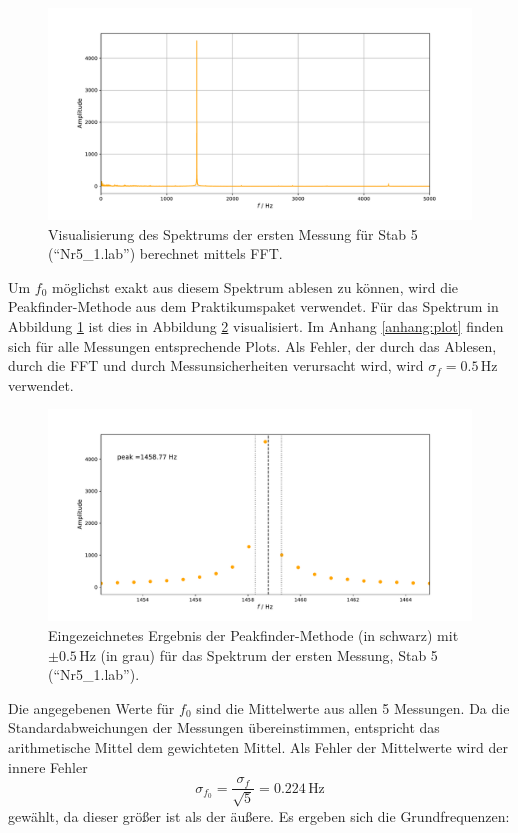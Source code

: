 \documentclass[a4paper, 12pt]{scrartcl}
\begin{document}
\begin{figure}[H]
	\centering
	\includegraphics[width=\linewidth]{plots/spektrum1.pdf}
	\caption{Visualisierung des Spektrums der ersten Messung für Stab 5 (\mbox{``Nr5\_1.lab''}) berechnet mittels FFT.}
	\label{pic:spektrum1}
\end{figure}

Um $f_0$ möglichst exakt aus diesem Spektrum ablesen zu können, wird die Peakfinder-Methode aus dem Praktikumspaket verwendet. Für das Spektrum in Abbildung \ref{pic:spektrum1} ist dies in Abbildung \ref{pic:spektrum2} visualisiert. Im Anhang \ref{anhang:plot} finden sich für alle Messungen entsprechende Plots. Als Fehler, der durch das Ablesen, durch die FFT und durch Messunsicherheiten verursacht wird, wird $\sigma_{f} = 0.5\,$Hz verwendet. 
\begin{figure}[H]
	\centering
	\includegraphics[width=\linewidth]{plots/spektrum2.pdf}
	\caption{Eingezeichnetes Ergebnis der Peakfinder-Methode (in schwarz) mit $\pm0.5\,$Hz (in grau) für das Spektrum der ersten Messung, Stab 5 (\mbox{``Nr5\_1.lab''}).}
	\label{pic:spektrum2}
\end{figure}

Die angegebenen Werte für $f_0$ sind die Mittelwerte aus allen 5 Messungen. Da die Standardabweichungen der Messungen übereinstimmen, entspricht das arithmetische Mittel dem gewichteten Mittel. Als Fehler der Mittelwerte wird der innere Fehler 
$$\sigma_{f_0} = \frac{\sigma_{f}}{\sqrt{5}} = 0.224\,\text{Hz}$$
gewählt, da dieser größer ist als der äußere. Es ergeben sich die Grundfrequenzen:
\end{document}
